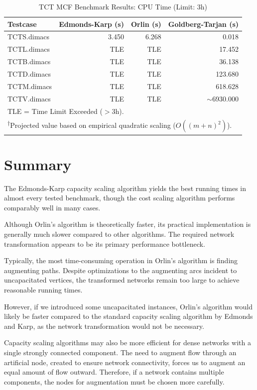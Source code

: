 \begin{table}[htbp]
    \centering
    \caption{TCT MCF Benchmark Results: CPU Time (Limit: 3h)}
    \label{tab:tct_benchmarks_cpu_projected}
    \begin{tabular}{lrrr}
        \toprule
        \textbf{Testcase} & \textbf{Edmonds-Karp (s)} & \textbf{Orlin (s)} & \textbf{Goldberg-Tarjan (s)} \\
        \midrule
        TCTS.dimacs & 3.450 & 6.268 & 0.018 \\
        TCTL.dimacs & TLE   & TLE   & 17.452 \\
        TCTB.dimacs & TLE   & TLE   & 36.138 \\
        TCTD.dimacs & TLE   & TLE   & 123.680 \\
        TCTM.dimacs & TLE   & TLE   & 618.628 \\
        TCTV.dimacs & TLE   & TLE   & $\sim$6930.000\rlap{\textsuperscript{$\dagger$}} \\
        \bottomrule
        \multicolumn{4}{l}{\small TLE = Time Limit Exceeded ($>3$h).} \\
        \multicolumn{4}{l}{\small \textsuperscript{$\dagger$}Projected value based on empirical quadratic scaling ($O((m+n)^2)$).}
    \end{tabular}
\end{table}


\section{Summary}
The Edmonds-Karp capacity scaling algorithm yields the best running times in almost every tested benchmark, though the cost scaling algorithm performs comparably well in many cases.

Although Orlin's algorithm is theoretically faster, its practical implementation is generally much slower compared to other algorithms. The required network transformation appears to be its primary performance bottleneck.

Typically, the most time-consuming operation in Orlin's algorithm is finding augmenting paths. Despite optimizations to the augmenting arcs incident to uncapacitated vertices, the transformed networks remain too large to achieve reasonable running times.

However, if we introduced some uncapacitated instances, Orlin's algorithm would likely be faster compared to the standard capacity scaling algorithm by Edmonds and Karp, as the network transformation would not be necessary.

Capacity scaling algorithms may also be more efficient for dense networks with a single strongly connected component. The need to augment flow through an artificial node, created to ensure network connectivity, forces us to augment an equal amount of flow outward. Therefore, if a network contains multiple components, the nodes for augmentation must be chosen more carefully.